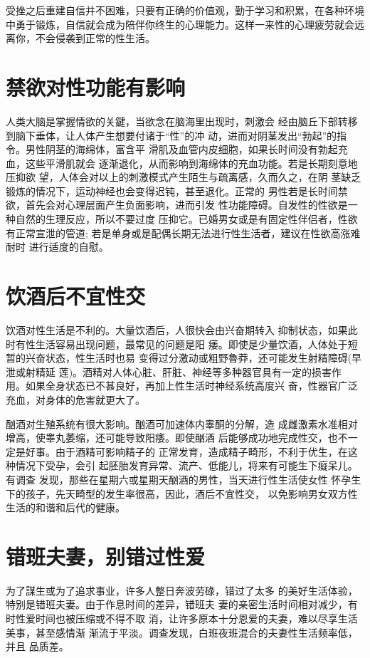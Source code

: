 \documentclass[12pt,UTF8]{ctexbook}
\begin{document}
受挫之后重建自信并不困难，只要有正确的价值观，勤于学习和积累，在各种环境中勇于锻炼，自信就会成为陪伴你终生的心理能力。这样一来性的心理疲劳就会远离你，不会侵袭到正常的性生活。

\section{禁欲对性功能有影响}

人类大脑是掌握情欲的关鍵，当欲念在脑海里出现时，刺激会
经由脑丘下部转移到脑下垂体，让人体产生想要付诸于“性”的冲
动，进而对阴茎发出“勃起”的指令。男性阴茎的海绵体，富含平
滑肌及血管内皮细胞，如果长时间没有勃起充血，这些平滑肌就会
逐渐退化，从而影响到海绵体的充血功能。若是长期刻意地压抑欲
望，人体会对以上的刺激模式产生陌生与疏离感，久而久之，在阴
茎缺乏锻炼的情况下，运动神经也会变得迟钝，甚至退化。正常的
男性若是长时间禁欲，首先会对心理层面产生负面影响，进而引发
性功能障碍。自发性的性欲是一种自然的生理反应，所以不要过度
压抑它。已婚男女或是有固定性伴侣者，性欲有正常宣泄的管道;
若是单身或是配偶长期无法进行性生活者，建议在性欲高涨难耐时
进行适度的自慰。

\section{饮酒后不宜性交}

饮酒对性生活是不利的。大量饮酒后，人很快会由兴奋期转入
抑制状态，如果此时有性生活容易出现问题，最常见的问题是阳
痿。即使是少量饮酒，人体处于短暂的兴奋状态，性生活时也易
变得过分激动或粗野魯莽，还可能发生射精障碍(早泄或射精延
莲)。酒精对人体心脏、肝脏、神经等多种器官具有一定的损害作
用。如果全身状态已不甚良好，再加上性生活时神经系统高度兴
奋，性器官广泛充血，对身体的危害就更大了。

酗酒对生殖系统有很大影响。酗酒可加速体内睾酮的分解，造
成雌激素水准相对增高，使睾丸萎缩，还可能导致阳痿。即使酗酒
后能够成功地完成性交，也不一定是好事。由于酒精可影响精子的
正常发育，造成精子畸形，不利于优生，在这种情况下受孕，会引
起胚胎发育异常、流产、低能儿，将来有可能生下癡呆儿。有调查
发现，那些在星期六或星期天酗酒的男性，当天进行性生活使女性
怀孕生下的孩子，先天畸型的发生率很高，因此，酒后不宜性交，
以免影响男女双方性生活的和谐和后代的健康。

\section{错班夫妻，别错过性爱}

为了謀生或为了追求事业，许多人整日奔波劳碌，错过了太多
的美好生活体验，特别是错班夫妻。由于作息时间的差异，错班夫
妻的亲密生活时间相对减少，有时性爱时间也被压缩或不得不取
消，让许多原本十分恩爱的夫妻，难以尽享生活美事，甚至感情渐
渐流于平淡。调查发现，白班夜班混合的夫妻性生活频率低，并且
品质差。
\end{document}
